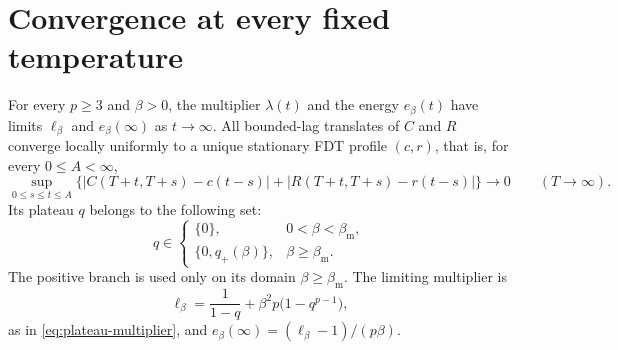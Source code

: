 \section{Convergence at every fixed temperature}\label{sec:all-temperature}

\begin{proposition}\label{sel:all-temperature}
For every $p\ge3$ and $\beta>0$, the multiplier $\lambda(t)$ and the energy $e_\beta(t)$ have limits $\ell_\beta$ and $e_\beta(\infty)$ as $t\to\infty$. All bounded-lag translates of $C$ and $R$ converge locally uniformly to a unique stationary FDT profile $(c,r)$, that is, for every $0\le A<\infty$,
\begin{equation}
 \sup_{0\le s\le t\le A}
 \bigl\{|C(T+t,T+s)-c(t-s)|+|R(T+t,T+s)-r(t-s)|\bigr\}
 \longrightarrow0\qquad(T\to\infty).
 \label{eq:all-temperature-window}
\end{equation}
Its plateau $q$ belongs to the following set:
\begin{equation}
 q\in\begin{cases}
 \{0\}, & 0<\beta<\beta_{\mathrm m},\\
 \{0,q_+(\beta)\}, & \beta\ge\beta_{\mathrm m}.
 \end{cases}
 \label{sel:two-possible-plateaux}
\end{equation}
The positive branch is used only on its domain $\beta\ge\beta_{\mathrm m}$. The limiting multiplier is
\[
 \ell_\beta=\frac1{1-q}+\beta^2p\bigl(1-q^{p-1}\bigr),
\]
as in \eqref{eq:plateau-multiplier}, and $e_\beta(\infty)=(\ell_\beta-1)/(p\beta)$.
\end{proposition}

